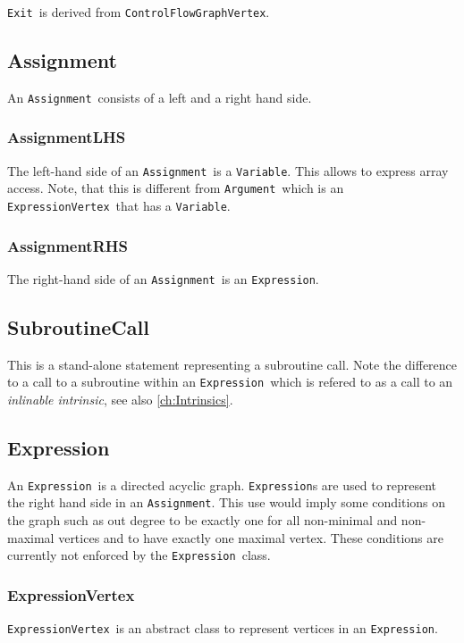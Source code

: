 \documentclass{book}
\newcommand{\Assignment}{{\tt Assignment}}
\newcommand{\Variable}{{\tt Variable}}
\newcommand{\ControlFlowGraphVertex}{{\tt ControlFlowGraphVertex}}
\newcommand{\Exit}{{\tt Exit}}
\newcommand{\Expression}{{\tt Expression}}
\newcommand{\ExpressionVertex}{{\tt ExpressionVertex}}
\newcommand{\Argument}{{\tt Argument}}
\begin{document}
\Exit\ is derived from \ControlFlowGraphVertex.

\subsection{Assignment}
\label{ssec:Assignment}

An \Assignment\ consists of a left and a right hand side.

\subsubsection{AssignmentLHS}

The left-hand side of an \Assignment\ is a \Variable. 
This allows to express array access.
Note, that this is different from \Argument\ which is an 
\ExpressionVertex\ that has a \Variable.

\subsubsection{AssignmentRHS}

The right-hand side of an \Assignment\ is an \Expression.

\subsection{SubroutineCall}
\label{ssec:SubroutineCall}
This is a stand-alone statement representing a subroutine call. 
Note the 
difference to a call to a subroutine within an \Expression\ which is 
refered to as a call to an {\em inlinable intrinsic}, 
see also \ref{ch:Intrinsics}.

\subsection{Expression}
\label{ssec:Expression}
An \Expression\ is a directed acyclic graph. 
{\Expression}s are used to represent
the right hand side in an \Assignment. 
This use would imply some conditions 
on the graph such as out degree to be exactly one for all 
non-minimal and non-maximal 
vertices and to have exactly one maximal vertex. 
These conditions are currently 
not enforced by the \Expression\ class.

\subsubsection{ExpressionVertex}
\ExpressionVertex\ is an abstract class to represent 
vertices in an \Expression.
\end{document}
